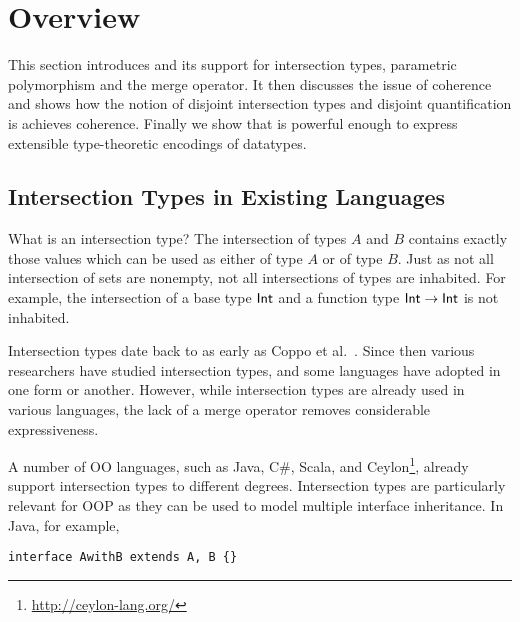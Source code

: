 \section{Overview}

This section introduces \name and its support for intersection types,
parametric polymorphism and the merge operator. It then discusses 
the issue of coherence and shows how the notion of disjoint
intersection types and disjoint quantification is achieves coherence.
Finally we show that \name is powerful enough to express
extensible type-theoretic encodings of datatypes.

\begin{comment}
It then shows that,
with unrestricted intersection types, the system
lacks \emph{coherence}. This motivates the introduction of
disjoint intersection types and extending universal quatification to
disjoint quantification, which is enough to ensure coherence.
\end{comment}

\subsection{Intersection Types in Existing Languages}

What is an intersection type? The intersection of types $A$ and $B$
contains exactly those values which can be used as either of type $A$
or of type $B$.  Just as not all intersection of sets are nonempty,
not all intersections of types are inhabited.  For example, the
intersection of a base type $\textsf{Int}$ and a function type
$\textsf{Int} \to \textsf{Int}$ is not inhabited.

Intersection types date back to as early as Coppo et
al.~\cite{coppo1981functional}. Since then various researchers have 
studied intersection types, and some languages have adopted in one
form or another. However, while intersection types are already used 
in various languages, the lack of a merge operator removes
considerable expressiveness.


A number of OO languages, such as
Java, C\#, Scala, and Ceylon\footnote{\url{http://ceylon-lang.org/}},
already support intersection types to different degrees. Intersection
types are particularly relevant for OOP as they can be used to model 
multiple interface inheritance. In Java, for example,

\begin{lstlisting}
interface AwithB extends A, B {}
\end{lstlisting}

